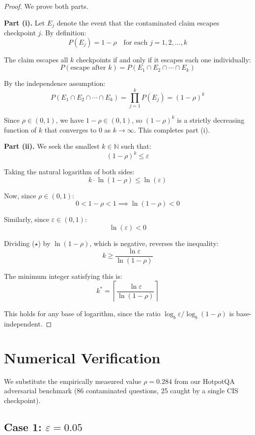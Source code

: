 \documentclass[12pt,a4paper]{article}
\begin{document}
\begin{proof}
We prove both parts.

\textbf{Part (i).} Let $E_j$ denote the event that the contaminated claim escapes checkpoint $j$. By definition:
\[
P(E_j) = 1 - \rho \quad \text{for each } j = 1, 2, \ldots, k
\]

The claim escapes all $k$ checkpoints if and only if it escapes each one individually:
\[
P(\text{escape after } k) = P(E_1 \cap E_2 \cap \cdots \cap E_k)
\]

By the independence assumption:
\[
P(E_1 \cap E_2 \cap \cdots \cap E_k) = \prod_{j=1}^{k} P(E_j) = (1-\rho)^k
\]

Since $\rho \in (0,1)$, we have $1-\rho \in (0,1)$, so $(1-\rho)^k$ is a strictly decreasing function of $k$ that converges to 0 as $k \to \infty$. This completes part (i).

\textbf{Part (ii).} We seek the smallest $k \in \mathbb{N}$ such that:
\[
(1-\rho)^k \leq \varepsilon
\]

Taking the natural logarithm of both sides:
\[
k \cdot \ln(1-\rho) \leq \ln(\varepsilon) \tag{$\star$}
\]

Now, since $\rho \in (0,1)$:
\[
0 < 1-\rho < 1 \implies \ln(1-\rho) < 0
\]

Similarly, since $\varepsilon \in (0,1)$:
\[
\ln(\varepsilon) < 0
\]

Dividing ($\star$) by $\ln(1-\rho)$, which is negative, reverses the inequality:
\[
k \geq \frac{\ln \varepsilon}{\ln(1-\rho)}
\]

The minimum integer satisfying this is:
\[
k^* = \left\lceil \frac{\ln \varepsilon}{\ln(1-\rho)} \right\rceil
\]

This holds for any base of logarithm, since the ratio $\log_b \varepsilon / \log_b(1-\rho)$ is base-independent.
\end{proof}

\section{Numerical Verification}

We substitute the empirically measured value $\rho = 0.284$ from our HotpotQA adversarial benchmark (86 contaminated questions, 25 caught by a single CIS checkpoint).

\subsection{Case 1: $\varepsilon = 0.05$}
\end{document}
